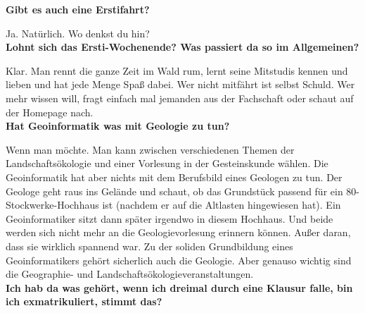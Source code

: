 \textbf{Gibt es auch eine Erstifahrt?}

Ja. Natürlich. Wo denkst du hin?\\

\textbf{Lohnt sich das Ersti-Wochenende? Was passiert da so im Allgemeinen?}

Klar. Man rennt die ganze Zeit im Wald rum, lernt seine Mitstudis kennen und lieben und hat jede Menge Spaß dabei. Wer nicht mitfährt ist selbst Schuld. Wer mehr wissen will, fragt einfach mal jemanden aus der Fachschaft oder schaut auf der Homepage nach.\\





\textbf{Hat Geoinformatik was mit Geologie zu tun?}

Wenn man möchte. Man kann zwischen verschiedenen Themen der Landschaftsökologie und einer Vorlesung in der Gesteinskunde wählen. Die Geoinformatik hat aber nichts mit dem Berufsbild eines Geologen zu tun. Der Geologe geht raus ins Gelände und schaut, ob das Grundstück passend für ein 80-Stockwerke-Hochhaus ist (nachdem er auf die Altlasten hingewiesen hat). Ein Geoinformatiker sitzt dann später irgendwo in diesem Hochhaus. Und beide werden sich nicht mehr an die Geologievorlesung erinnern können. Außer daran, dass sie wirklich spannend war. Zu der soliden Grundbildung eines Geoinformatikers gehört sicherlich auch die Geologie. Aber genauso wichtig sind die Geographie- und Landschaftsökologieveranstaltungen.\\

\textbf{Ich hab da was gehört, wenn ich dreimal durch eine Klausur falle, bin ich exmatrikuliert, stimmt das?}

